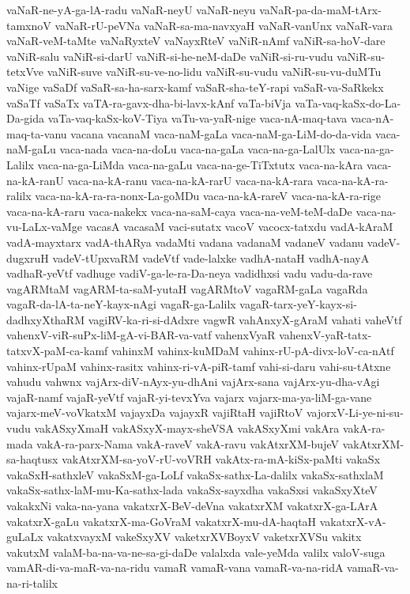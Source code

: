 {vaNaR-ne-yA-ga-lA-radu
vaNaR-neyU
vaNaR-neyu
vaNaR-pa-da-maM-tArx-tamxnoV
vaNaR-rU-peVNa
vaNaR-sa-ma-navxyaH
vaNaR-vanUnx
vaNaR-vara
vaNaR-veM-taMte
vaNaRyxteV
vaNayxRteV
vaNiR-nAmf
vaNiR-sa-hoV-dare
vaNiR-salu
vaNiR-si-darU
vaNiR-si-he-neM-daDe
vaNiR-si-ru-vudu
vaNiR-su-tetxVve
vaNiR-suve
vaNiR-su-ve-no-lidu
vaNiR-su-vudu
vaNiR-su-vu-duMTu
vaNige
vaSaDf
vaSaR-sa-ha-sarx-kamf
vaSaR-sha-teY-rapi
vaSaR-va-SaRkekx
vaSaTf
vaSaTx
vaTA-ra-gavx-dha-bi-lavx-kAnf
vaTa-biVja
vaTa-vaq-kaSx-do-La-Da-gida
vaTa-vaq-kaSx-koV-Tiya
vaTu-va-yaR-nige
vaca-nA-maq-tava
vaca-nA-maq-ta-vanu
vacana
vacanaM
vaca-naM-gaLa
vaca-naM-ga-LiM-do-da-vida
vaca-naM-gaLu
vaca-nada
vaca-na-doLu
vaca-na-gaLa
vaca-na-ga-LalUlx
vaca-na-ga-Lalilx
vaca-na-ga-LiMda
vaca-na-gaLu
vaca-na-ge-TiTxtutx
vaca-na-kAra
vaca-na-kA-ranU
vaca-na-kA-ranu
vaca-na-kA-rarU
vaca-na-kA-rara
vaca-na-kA-ra-ralilx
vaca-na-kA-ra-ra-nonx-La-goMDu
vaca-na-kA-rareV
vaca-na-kA-ra-rige
vaca-na-kA-raru
vaca-nakekx
vaca-na-saM-caya
vaca-na-veM-teM-daDe
vaca-na-vu-LaLx-vaMge
vacasA
vacasaM
vaci-sutatx
vacoV
vacocx-tatxdu
vadA-kAraM
vadA-mayxtarx
vadA-thARya
vadaMti
vadana
vadanaM
vadaneV
vadanu
vadeV-dugxruH
vadeV-tUpxvaRM
vadeVtf
vade-lalxke
vadhA-nataH
vadhA-nayA
vadhaR-yeVtf
vadhuge
vadiV-ga-le-ra-Da-neya
vadidhxsi
vadu
vadu-da-rave
vagARMtaM
vagARM-ta-saM-yutaH
vagARMtoV
vagaRM-gaLa
vagaRda
vagaR-da-lA-ta-neY-kayx-nAgi
vagaR-ga-Lalilx
vagaR-tarx-yeY-kayx-si-dadhxyXthaRM
vagiRV-ka-ri-si-dAdxre
vagwR
vahAnxyX-gAraM
vahati
vaheVtf
vahenxV-viR-suPx-liM-gA-vi-BAR-va-vatf
vahenxVyaR
vahenxV-yaR-tatx-tatxvX-paM-ca-kamf
vahinxM
vahinx-kuMDaM
vahinx-rU-pA-divx-loV-ca-nAtf
vahinx-rUpaM
vahinx-rasitx
vahinx-ri-vA-piR-tamf
vahi-si-daru
vahi-su-tAtxne
vahudu
vahwnx
vajArx-diV-nAyx-yu-dhAni
vajArx-sana
vajArx-yu-dha-vAgi
vajaR-namf
vajaR-yeVtf
vajaR-yi-tevxYva
vajarx
vajarx-ma-ya-liM-ga-vane
vajarx-meV-voVkatxM
vajayxDa
vajayxR
vajiRtaH
vajiRtoV
vajorxV-Li-ye-ni-su-vudu
vakASxyXmaH
vakASxyX-mayx-sheVSA
vakASxyXmi
vakAra
vakA-ra-mada
vakA-ra-parx-Nama
vakA-raveV
vakA-ravu
vakAtxrXM-bujeV
vakAtxrXM-sa-haqtusx
vakAtxrXM-sa-yoV-rU-voVRH
vakAtx-ra-mA-kiSx-paMti
vakaSx
vakaSxH-sathxleV
vakaSxM-ga-LoLf
vakaSx-sathx-La-dalilx
vakaSx-sathxlaM
vakaSx-sathx-laM-mu-Ka-sathx-lada
vakaSx-sayxdha
vakaSxsi
vakaSxyXteV
vakakxNi
vaka-na-yana
vakatxrX-BeV-deVna
vakatxrXM
vakatxrX-ga-LArA
vakatxrX-gaLu
vakatxrX-ma-GoVraM
vakatxrX-mu-dA-haqtaH
vakatxrX-vA-guLaLx
vakatxvayxM
vakeSxyXV
vaketxrXVBoyxV
vaketxrXVSu
vakitx
vakutxM
valaM-ba-na-va-ne-sa-gi-daDe
valalxda
vale-yeMda
valilx
valoV-suga
vamAR-di-va-maR-va-na-ridu
vamaR
vamaR-vana
vamaR-va-na-ridA
vamaR-va-na-ri-talilx
}
